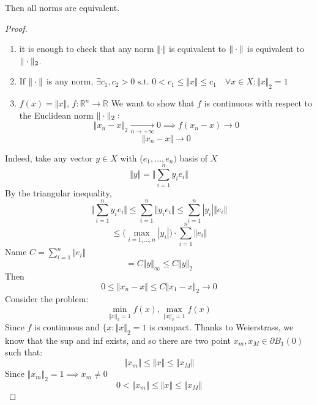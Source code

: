 Then all norms are equivalent.

\begin{proof}\ \\
\begin{enumerate}
    \item it is enough to check that any norm $\Vert \cdot \Vert$ is equivalent to $\Vert \cdot \Vert$ is equivalent to $\Vert \cdot \Vert_2$.
    \item If $\Vert \cdot \Vert$ is any norm, $\exists c_1, c_2>0 \text{ s.t. } 0<c_1\leq \Vert x\Vert \leq c_1\quad \forall x\in X:\Vert x\Vert_2=1$
    \item $f(x)=\Vert x\Vert$, $f:\mathbb R^n\to \mathbb R$
We want to show that $f$ is continuous with respect to the Euclidean norm $\Vert \cdot \Vert_2:$\\
$$\Vert x_n-x\Vert_2\xrightarrow[n\to +\infty]{}0\implies f(x_n-x)\to 0$$
$$\Vert x_n-x\Vert \to 0$$
\end{enumerate}
Indeed, take any vector $y\in X$ with ($e_1,\dots,e_n)$ basis of $X$
$$\Vert y\Vert=\Big\Vert\sum_{i=1}^n y_ie_i\Big\Vert$$
By the triangular inequality,
$$\Big\Vert\sum_{i=1}^n y_ie_i\Big\Vert\leq \sum_{i=1}^n\Vert y_ie_i\Vert\leq\sum_{i=1}^n|y_i|\Vert e_i\Vert$$
$$\leq \Big (\max_{i=1,\dots,n}|y_i|\Big)\cdot \sum_{i=1}^n\Vert e_i\Vert$$
Name $C=\sum_{i=1}^n\Vert e_i\Vert$
$$=C\Vert y\Vert_\infty\leq C \Vert y\Vert_2$$
Then
$$0\leq \Vert x_n-x\Vert\leq C\Vert x_1-x\Vert_2\to 0$$
Consider the problem:
$$\min_{\Vert x\Vert_2=1}f(x),\max_{\Vert x\Vert_2=1}f(x)$$
Since $f$ is continuous and $\{ x:\Vert x\Vert_2 =1$ is compact.
Thanks to Weierstrass, we know that the sup and inf exists, and so there are two point $x_m, x_M\in \partial B_1(0)$ such that:
$$\Vert x_m\Vert\leq \Vert x\Vert \leq \Vert x_M\Vert$$
Since $\Vert x_m\Vert_2=1\implies x_m\neq 0$
$$0<\Vert x_m\Vert\leq \Vert x\Vert \leq \Vert x_M\Vert$$
\end{proof}
